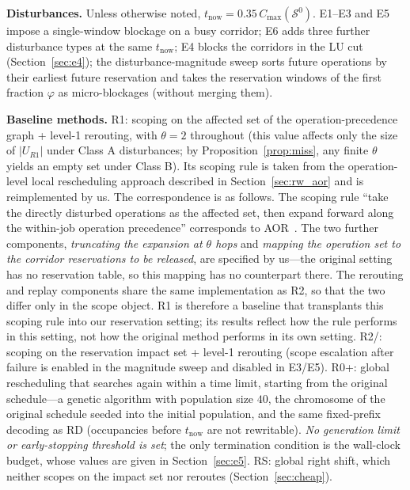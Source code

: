 \textbf{Disturbances.}
Unless otherwise noted, \(t_{\mathrm{now}}=0.35\,C_{\max}(\mathcal{S}^0)\).
E1--E3 and E5 impose a single-window blockage on a busy corridor; E6 adds three further disturbance types at the same \(t_{\mathrm{now}}\);
E4 blocks the corridors in the LU cut (Section~\ref{sec:e4});
the disturbance-magnitude sweep sorts future operations by their earliest future reservation and takes the reservation windows of the first fraction \(\varphi\) as micro-blockages (without merging them).

\textbf{Baseline methods.}
R1: scoping on the affected set of the operation-precedence graph + level-1 rerouting, with \(\theta=2\) throughout
(this value affects only the size of \(|U_{R1}|\) under Class A disturbances; by Proposition~\ref{prop:miss}, any finite \(\theta\) yields an empty set under
Class B). Its scoping rule is taken from the operation-level
local rescheduling approach described in Section~\ref{sec:rw_aor} and is reimplemented by us. The correspondence is as follows. The scoping rule ``take the directly disturbed operations as the affected set,
then expand forward along the within-job operation precedence'' corresponds to
AOR~\cite{abumaizar1997rescheduling,subramaniam2003maor}.
The two further components, \emph{truncating the expansion at \(\theta\) hops} and \emph{mapping the operation set to the corridor reservations to be released},
are specified by us---the original setting has no reservation table, so this mapping has no counterpart there.
The rerouting and replay components share the same implementation as R2, so that the two differ only in the scope object.
R1 is therefore a baseline that transplants this scoping rule into our reservation setting; its results reflect how the rule performs in this setting,
not how the original method performs in its own setting.
R2/\STRC: scoping on the reservation impact set + level-1 rerouting (scope escalation after failure is enabled in the magnitude sweep and disabled in E3/E5).
R0+: global rescheduling that searches again within a time limit, starting from the original schedule---a genetic algorithm with population size \(40\),
the chromosome of the original schedule seeded into the initial population, and the same fixed-prefix decoding as RD (occupancies before \(t_{\mathrm{now}}\)
are not rewritable). \emph{No generation limit or early-stopping threshold is set}; the only termination condition is the wall-clock budget,
whose values are given in Section~\ref{sec:e5}.
RS: global right shift, which neither scopes on the impact set nor reroutes (Section~\ref{sec:cheap}).
